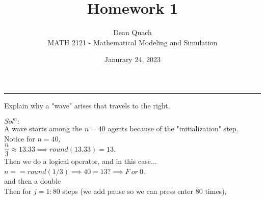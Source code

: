 \documentclass[12pt]{article}
\newenvironment{exercise}[2][Exercise]{\begin{trivlist}
\item[\hskip \labelsep {\bfseries #1}\hskip \labelsep {\bfseries #2.}]}{\end{trivlist}}
\begin{document}
 
 
 
\title{Homework 1}%
\author{Dean Quach\\ %
MATH 2121 - Mathematical Modeling and Simulation} %
\date{Janurary 24, 2023}
\maketitle

\hrule
\vspace{20pt}




\begin{exercise}{(a)} Explain why a "wave" arises that travels to the right.
\end{exercise}
$Sol^n:$\\

A wave starts among the $n=40$ agents because of the "initialization" step. \\
Notice for $n=40,$ \\
$\dfrac{n}{3}\approx 13.33 \implies round(13.33)=13.$\\

Then we do a logical operator, and in this case...\\
$n==round(1/3)\implies40=13?\implies F ~or~0$.\\
and then a double\\

Then for $j=1:80$ steps (we add pause so we can press enter 80 times),\\
%

\end{document}
